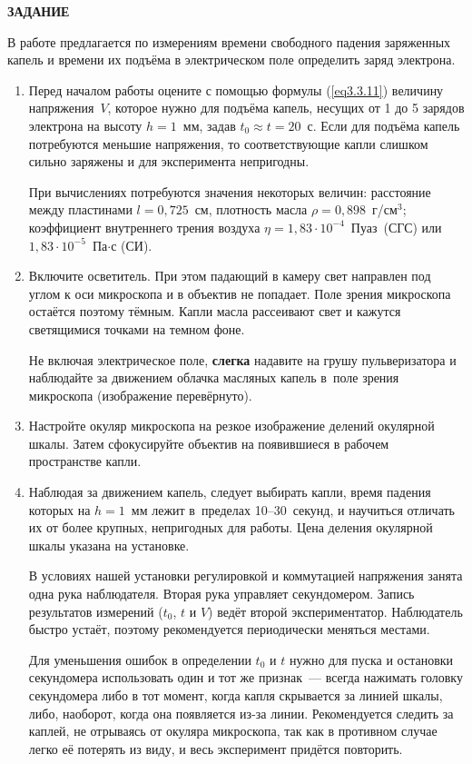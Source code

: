 {\Large \bf ЗАДАНИЕ}

В работе предлагается по измерениям времени свободного падения заряженных капель и времени их подъёма в электрическом поле определить заряд электрона.

\begin{enumerate}

\item{Перед началом работы оцените с помощью формулы (\ref{eq3.3.11}) величину напряжения~$V$, которое нужно для подъёма капель, несущих от 1 до 5 зарядов электрона на высоту $h=1$~мм, задав $t_0\approx t=20$~с. Если для подъёма капель потребуются меньшие напряжения, то соответствующие капли слишком сильно заряжены и для эксперимента непригодны.

При вычислениях потребуются значения некоторых величин: расстояние между пластинами $l=0,725$~см, плотность масла
$\rho=0,898$~г/см$^3$; коэффициент внутреннего трения воздуха $\eta=1,83\cdot 10^{-4}$~Пуаз~(СГС) или $1,83\cdot 10^{-5}$~Па$\cdot$с
(СИ).}

\item{ Включите осветитель. При этом падающий в камеру свет направлен под углом к оси микроскопа и в объектив не попадает. Поле зрения микроскопа остаётся поэтому тёмным. Капли масла рассеивают свет и кажутся светящимися точками на темном фоне.

Не включая электрическое поле, {\bf слегка} надавите на грушу пульверизатора  и наблюдайте за движением облачка масляных капель в~поле зрения микроскопа (изображение перевёрнуто).}

\item{ Настройте окуляр микроскопа на резкое изображение делений окулярной шкалы. Затем сфокусируйте объектив на появившиеся в рабочем пространстве капли.}

\item{ Наблюдая за движением капель, следует выбирать капли, время падения которых на $h=1$~мм лежит в~пределах
10--30~секунд, и научиться отличать их от более крупных, непригодных для работы. Цена деления окулярной шкалы указана на установке.

В условиях нашей установки регулировкой и коммутацией напряжения занята одна рука наблюдателя. Вторая рука управляет секундомером. Запись результатов измерений ($t_0$, $t$ и $V$) ведёт второй экспериментатор. Наблюдатель быстро устаёт, поэтому рекомендуется периодически меняться местами.

Для уменьшения ошибок в определении $t_0$ и $t$ нужно для пуска и остановки секундомера использовать один и тот же признак~--- всегда нажимать головку секундомера либо в тот момент, когда капля скрывается за линией шкалы, либо, наоборот, когда она появляется из-за линии. Рекомендуется следить за каплей, не отрываясь от окуляра микроскопа, так как в противном случае легко её потерять из виду, и весь эксперимент придётся повторить.}


\end{enumerate}
